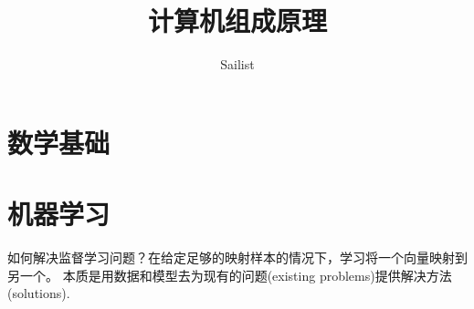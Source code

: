 \documentclass{book}
\title{计算机组成原理}
\author{Sailist}
\begin{document}
    \renewcommand{\baselinestretch}{0.75}\normalsize
    \tableofcontents
    \newpage
    \renewcommand{\baselinestretch}{1.3}\normalsize
    \part{数学基础}
    
    
    

    \part{机器学习}
    如何解决监督学习问题？在给定足够的映射样本的情况下，学习将一个向量映射到另一个。
    本质是用数据和模型去为现有的问题(existing problems)提供解决方法(solutions).
    
    
    
    
    
    
\end{document}
